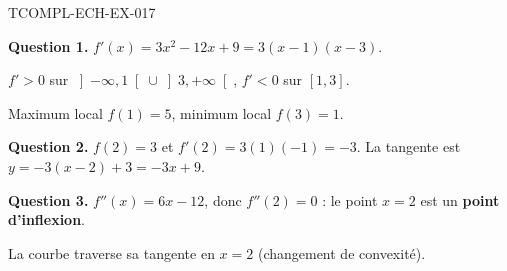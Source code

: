 \begin{corrige}{TCOMPL-ECH-EX-017}

\textbf{Question 1.} $f'(x) = 3x^2 - 12x + 9 = 3(x-1)(x-3)$.


$f' > 0$ sur $\left]-\infty,1\right[ \cup \left]3,+\infty\right[$, $f' < 0$ sur $[1,3]$.

Maximum local $f(1) = 5$, minimum local $f(3) = 1$.

\textbf{Question 2.} $f(2) = 3$ et $f'(2) = 3(1)(-1) = -3$. La tangente est $y = -3(x-2)+3 = -3x+9$.

\textbf{Question 3.} $f''(x) = 6x - 12$, donc $f''(2) = 0$ : le point $x=2$ est un \textbf{point d'inflexion}.

La courbe traverse sa tangente en $x = 2$ (changement de convexité).

\end{corrige}

